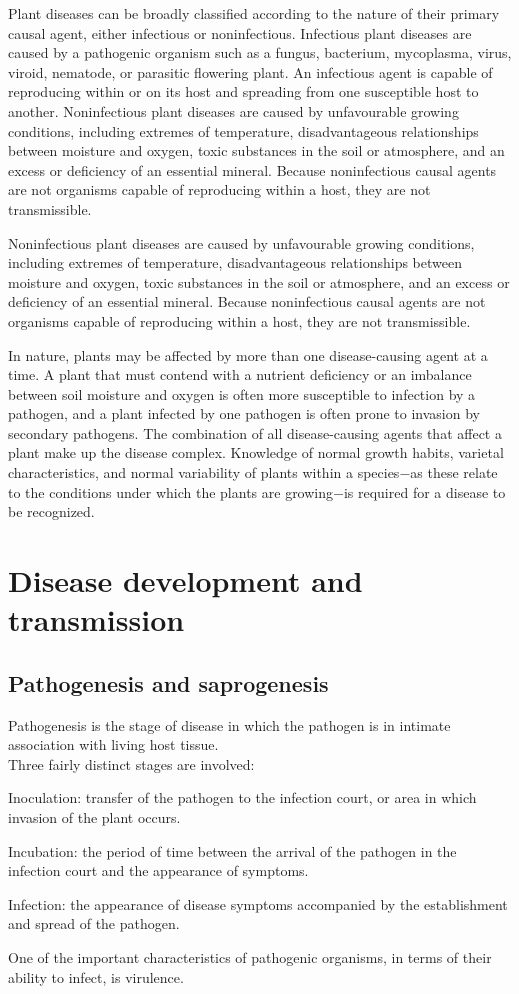 \documentclass[a4paper,12pt]{article}
\begin{document}
Plant diseases can be broadly classified according to the nature of their primary causal agent, either infectious or noninfectious. Infectious plant diseases are caused by a pathogenic organism such as a fungus, bacterium, mycoplasma, virus, viroid, nematode, or parasitic flowering plant. An infectious agent is capable of reproducing within or on its host and spreading from one susceptible host to another. Noninfectious plant diseases are caused by unfavourable growing conditions, including extremes of temperature, disadvantageous relationships between moisture and oxygen, toxic substances in the soil or atmosphere, and an excess or deficiency of an essential mineral. Because noninfectious causal agents are not organisms capable of reproducing within a host, they are not transmissible.

Noninfectious plant diseases are caused by unfavourable growing conditions, including extremes of temperature, disadvantageous relationships between moisture and oxygen, toxic substances in the soil or atmosphere, and an excess or deficiency of an essential mineral. Because noninfectious causal agents are not organisms capable of reproducing within a host, they are not transmissible.

In nature, plants may be affected by more than one disease-causing agent at a time. A plant that must contend with a nutrient deficiency or an imbalance between soil moisture and oxygen is often more susceptible to infection by a pathogen, and a plant infected by one pathogen is often prone to invasion by secondary pathogens. The combination of all disease-causing agents that affect a plant make up the disease complex. Knowledge of normal growth habits, varietal characteristics, and normal variability of plants within a species$-$as these relate to the conditions under which the plants are growing$-$is required for a disease to be recognized.


\section{Disease development and transmission}
\subsection{Pathogenesis and saprogenesis}
Pathogenesis is the stage of disease in which the pathogen is in intimate association with living host tissue. \\ Three fairly distinct stages are involved:
\begin{description}
\item Inoculation: transfer of the pathogen to the infection court, or area in which invasion of the plant occurs.
\item Incubation: the period of time between the arrival of the pathogen in the infection court and the appearance of symptoms.
\item Infection: the appearance of disease symptoms accompanied by the establishment and spread of the pathogen.
\end{description}
One of the important characteristics of pathogenic organisms, in terms of their ability to infect, is virulence.
\end{document}
